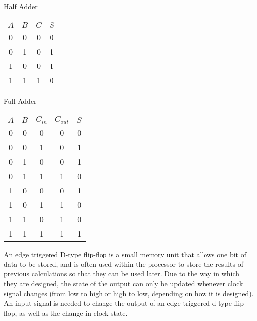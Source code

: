   Half Adder
  
  \begin{table}[H]
  	\centering
  	\begin{tabular}{|cc|c|c|} \hline
  		$A$ & $B$ & $C$ & $S$ \\ \hline
  		0 & 0 & 0 & 0 \\
  		0 & 1 & 0 & 1 \\
  		1 & 0 & 0 & 1 \\
  		1 & 1 & 1 & 0 \\\hline
  	\end{tabular}
  \end{table}
  
  Full Adder
  
  \begin{table}[H]
  	\centering
  	\begin{tabular}{|ccc|c|c|} \hline
  		$A$ & $B$ & $C_{in}$ & $C_{out}$ & $S$ \\ \hline
  		0 & 0 & 0 & 0 & 0 \\
  		0 & 0 & 1 & 0 & 1 \\
  		0 & 1 & 0 & 0 & 1 \\
  		0 & 1 & 1 & 1 & 0 \\
  		1 & 0 & 0 & 0 & 1 \\
  		1 & 0 & 1 & 1 & 0 \\
  		1 & 1 & 0 & 1 & 0 \\
  		1 & 1 & 1 & 1 & 1 \\ \hline
  	\end{tabular}
  \end{table}
  
  An edge triggered D-type flip-flop is a small memory unit that allows one bit of data to be stored, and is often used within the processor to store the results of previous calculations so that they can be used later. Due to the way in which they are designed, the state of the output can only be updated whenever clock signal changes (from low to high or high to low, depending on how it is designed). An input signal is needed to change the output of an edge-triggered d-type flip-flop, as well as the change in clock state.
  
